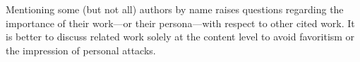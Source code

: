 


\noindent Mentioning some (but not all) authors by name raises questions regarding the importance of their work---or their persona---with respect to other cited work.
It is better to discuss related work solely at the content level to avoid favoritism or the impression of personal attacks.
